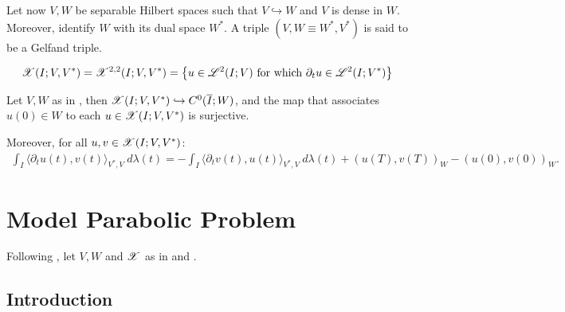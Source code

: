 \begin{definition} \label{definition:gelfand}
    Let now $V, W$ be separable Hilbert spaces such that $V \hookrightarrow W$ and $V$ is dense in $W$. Moreover, identify $W$ with its dual space $W^*$. A triple $\left( V, W \equiv W^*, V^* \right)$ is said to be a Gelfand triple.
\end{definition}

\begin{definition}[$\SpaceX(I; V, V^*)$] \label{definition:x}
    \begin{align}
        \mathscr{X}(I; V, V^*) = \mathscr{X}^{2, 2}(I; V, V^*) = \left\{ u \in \mathscr{L}^{2}(I; V) \text{ for which } \partial_t u \in \mathscr{L}^{2}(I; V^*) \right\}
    \end{align}
\end{definition}

\begin{theorem}
    Let $V, W$ as in , then \newline \nobreak $\mathscr{X}(I; V, V^*) \hookrightarrow C^0(\overline{I};W)$, and the map that associates $u(0) \in W$ to each $u \in \mathscr{X}(I; V, V^*)$ is surjective.

    Moreover, for all $u, v \in \mathscr{X}(I; V, V^*)$:
    \begin{align}
        \int_I \langle \partial_t u(t), v(t) \rangle_{V^*, V} ~ d \lambda(t) = - \int_I \langle \partial_t v(t), u(t) \rangle_{V^*, V} ~ d \lambda(t) + \left( u(T), v(T) \right)_W - \left( u(0), v(0) \right)_W.
    \end{align}
\end{theorem}

\newpage
\section{Model Parabolic Problem} \label{sec:model_problem}

Following \cite[p.~124]{Ern2021}, let $V, W$ and $\mathscr{X}$ as in  and .

\subsection{Introduction} \label{subsection:introduction}

